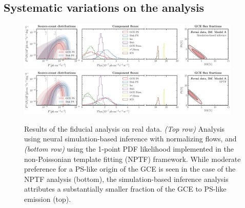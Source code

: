 \documentclass[prd,aps,10pt,nofootinbib,twocolumn,superscriptaddress,preprintnumbers,balancelastpage,longbibliography]{revtex4-1}
\begin{document}
\subsection{Systematic variations on the analysis}
\label{sec:systematics}





%
\begin{figure}
    \centering
    \includegraphics[width=0.95\textwidth]{plots/data_fid_sbi_modelA.pdf}
    \includegraphics[width=0.95\textwidth]{plots/data_fid_nptf_modelA.pdf}
    \caption{Results of the fiducial analysis on real \Fermi data. \emph{(Top row)} Analysis using neural simulation-based inference with normalizing flows, and \emph{(bottom row)} using the 1-point PDF likelihood implemented in the non-Poissonian template fitting (NPTF) framework. While moderate preference for a PS-like origin of the GCE is seen in the case of the NPTF analysis (bottom), the simulation-based inference analysis attributes a substantially smaller fraction of the GCE to PS-like emission (top).}
    \label{fig:fid_data_modelA}
\end{figure}
%
\end{document}
